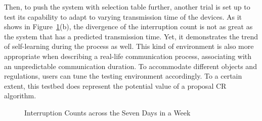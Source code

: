 Then, to push the system with selection table further, another trial is set up to test its capability to adapt to varying transmission time of the devices. As it shows in Figure~\ref{fig:interruption_in_a_week}(b), the divergence of the interruption count is not as great as the system that has a predicted transmission time. Yet, it demonstrates the trend of self-learning during the process as well. This kind of environment is also more appropriate when describing a real-life communication process, associating with an unpredictable communication duration. To accommodate different objects and regulations, users can tune the testing environment accordingly. To a certain extent, this testbed does represent the potential value of a proposal CR algorithm.

\begin{figure}[ht]
 \hfill 	
\caption{Interruption Counts across the Seven Days in a Week}
\label{fig:interruption_in_a_week}
\end{figure}
